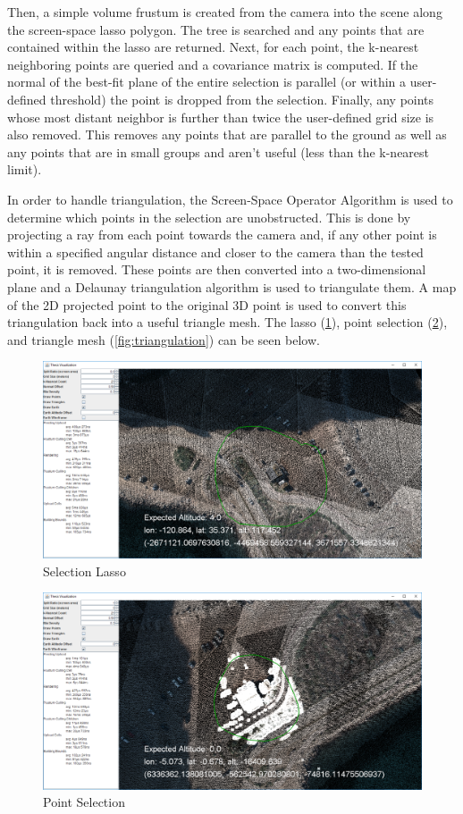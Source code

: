 Then, a simple volume frustum is created from the camera into the scene along
the screen-space lasso polygon. The tree is searched and any points that are
contained within the lasso are returned. Next, for each point, the k-nearest
neighboring points are queried and a covariance matrix is computed. If the
normal of the best-fit plane of the entire selection is parallel (or within a
user-defined threshold) the point is dropped from the selection. Finally, any
points whose most distant neighbor is further than twice the user-defined grid
size is also removed. This removes any points that are parallel to the ground as
well as any points that are in small groups and aren't useful (less than the
k-nearest limit).

In order to handle triangulation, the Screen-Space Operator Algorithm is used to
determine which points in the selection are unobstructed. This is done by
projecting a ray from each point towards the camera and, if any other point is
within a specified angular distance and closer to the camera than the tested
point, it is removed. These points are then converted into a two-dimensional
plane and a Delaunay triangulation algorithm is used to triangulate them. A map
of the 2D projected point to the original 3D point is used to convert this
triangulation back into a useful triangle mesh. The lasso (\ref{fig:lasso}),
point selection (\ref{fig:pointSelection}), and triangle mesh
(\ref{fig:triangulation}) can be seen below.

\begin{figure}[htp]
\begin{center}
  \includegraphics[width=.75\linewidth]{images/lasso.png}
  \caption{Selection Lasso}
  \label{fig:lasso}
\end{center}
\end{figure}

\begin{figure}[htp]
\begin{center}
  \includegraphics[width=.75\linewidth]{images/pointSelection.png}
  \caption{Point Selection}
  \label{fig:pointSelection}
\end{center}
\end{figure}

